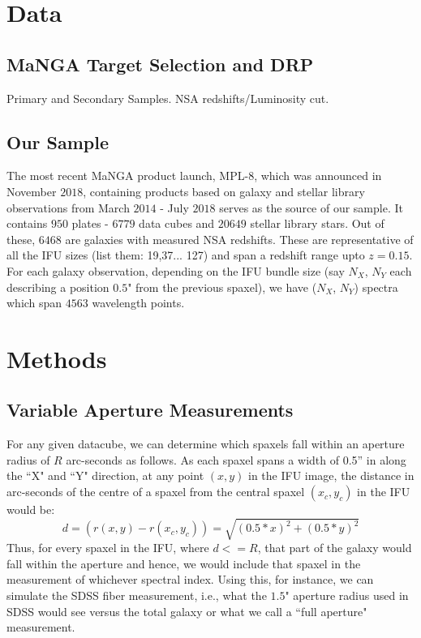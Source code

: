 \section{Data}
\subsection{MaNGA Target Selection and DRP}
Primary and Secondary Samples. NSA redshifts/Luminosity cut.

\subsection{Our Sample}
The most recent MaNGA product launch, MPL-$8$, which was announced in November $2018$, containing products based on galaxy and stellar library observations from March $2014$ - July $2018$ serves as the source of our sample. It contains $950$ plates - $6779$ data cubes and $20649$ stellar library stars. Out of these, $6468$ are galaxies with measured NSA redshifts. These are representative of all the IFU sizes (list them: 19,37... 127) and span a redshift range upto $z = 0.15$.\\
For each galaxy observation, depending on the IFU bundle size (say $N_{X}$, $N_{Y}$ each describing a position $0.5$" from the previous spaxel), we have ($N_{X}$, $N_{Y}$) spectra which span $4563$ wavelength points. 

\section{Methods}
\label{sec:chap2methods}

\subsection{Variable Aperture Measurements}
For any given datacube, we can determine which spaxels fall within an aperture radius of $R$ arc-seconds as follows. As each spaxel spans a width of 0.5'' in along the ``X" and ``Y" direction, at any point $(x,y)$ in the IFU image, the distance in arc-seconds of the centre of a spaxel from the central spaxel $(x_{c},y_{c})$ in the IFU would be:
$$ d = (r(x,y) - r(x_{c},y_{c})) = \sqrt{(0.5*x)^2 + (0.5*y)^2} $$
Thus, for every spaxel in the IFU, where $d<=R$, that part of the galaxy would fall within the aperture and hence, we would include that spaxel in the measurement of whichever spectral index. Using this, for instance, we can simulate the SDSS fiber measurement, i.e.,  what the $1.5$" aperture radius used in SDSS would see versus the total galaxy or what we call a ``full aperture" measurement.

